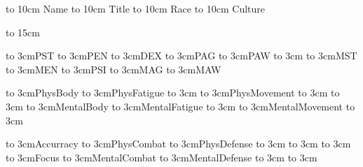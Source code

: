 \vbox{
	\hbox to 10cm {Name \hrulefill}
	\hbox to 10cm {Title \hrulefill}
	\hbox to 10cm {Race \hrulefill}
	\hbox to 10cm {Culture \hrulefill}
}
\bigskip

\hbox to 15cm{
	\vbox{
		\hbox to 3cm{PST \hrulefill}
		\hbox to 3cm{PEN \hrulefill}
		\hbox to 3cm{DEX \hrulefill}
		\hbox to 3cm{PAG \hrulefill}
		\hbox to 3cm{PAW \hrulefill}
		\hbox to 3cm{ \hrulefill}
		\hbox to 3cm{MST \hrulefill}
		\hbox to 3cm{MEN \hrulefill}
		\hbox to 3cm{PSI \hrulefill}
		\hbox to 3cm{MAG \hrulefill}
		\hbox to 3cm{MAW \hrulefill}
	}

	\hfil
	
	\vbox{
		\hbox to 3cm{PhysBody \hrulefill}
		\hbox to 3cm{PhysFatigue \hrulefill}
		\hbox to 3cm{}
		\hbox to 3cm{PhysMovement \hrulefill}
		\hbox to 3cm{}
		\hbox to 3cm{ \hrulefill}
		\hbox to 3cm{MentalBody \hrulefill}
		\hbox to 3cm{MentalFatigue \hrulefill}
		\hbox to 3cm{}
		\hbox to 3cm{MentalMovement \hrulefill}
		\hbox to 3cm{}
	}

	\hfil

	\vbox{
		\hbox to 3cm{Accurracy \hrulefill}
		\hbox to 3cm{PhysCombat \hrulefill}
		\hbox to 3cm{PhysDefense \hrulefill}
		\hbox to 3cm{}
		\hbox to 3cm{}
		\hbox to 3cm{ \hrulefill}
		\hbox to 3cm{Focus \hrulefill}
		\hbox to 3cm{MentalCombat \hrulefill}
		\hbox to 3cm{MentalDefense \hrulefill}
		\hbox to 3cm{}
		\hbox to 3cm{}
	}

}


